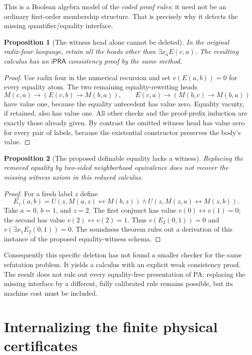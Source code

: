 \documentclass[11pt]{article}
\newtheorem{proposition}{Proposition}
\newcommand{\ipra}{\mathsf{iPRA}}
\begin{document}
This is a Boolean algebra model of the \emph{coded proof rules}; it need
not be an ordinary first-order membership structure. That is precisely
why it detects the missing quantifier/equality interface.

\begin{proposition}[The witness head alone cannot be deleted]
In the original radix-four language, retain all the heads other than
$\exists x_a E(c,a)$. The resulting calculus has an $\ipra$ consistency
proof by the same method.
\end{proposition}
\begin{proof}
Use radix four in the numerical recursion and set $v(E(a,b))=0$ for every
equality atom. The two remaining equality-rewriting heads
\[
 M(c,a)\to(E(c,b)\to M(b,a)),\qquad
 E(c,a)\to(M(b,c)\to M(b,a))
\]
have value one, because the equality antecedent has value zero.
Equality vacuity, if retained, also has value one. All other checks and
the proof-prefix induction are exactly those already given.
By contrast the omitted witness head has value zero for every pair of
labels, because the existential constructor preserves the body's value.
\end{proof}

\begin{proposition}[The proposed definable equality lacks a witness]
Replacing the removed equality by two-sided neighborhood equivalence
does not recover the missing witness axiom in this reduced calculus.
\end{proposition}
\begin{proof}
For a fresh label $z$ define
\[
 E_z(a,b)=U(z,M(a,z)\leftrightarrow M(b,z))
       \wedge U(z,M(z,a)\leftrightarrow M(z,b)).
\]
Take $a=0$, $b=1$, and $z=2$. The first conjunct has value
$v(0)\leftrightarrow v(1)=0$; the second has value
$v(2)\leftrightarrow v(2)=1$. Thus $v(E_2(0,1))=0$ and
$v(\exists x_1 E_2(0,1))=0$. The soundness theorem rules out a derivation
of this instance of the proposed equality-witness schema.
\end{proof}

Consequently this specific deletion has not found a smaller checker for
the same refutation problem. It yields a calculus with an explicit weak
consistency proof. The result does not rule out every equality-free
presentation of PA: replacing the missing interface by a different, fully
calibrated rule remains possible, but its machine cost must be included.

\section{Internalizing the finite physical certificates}
\end{document}
